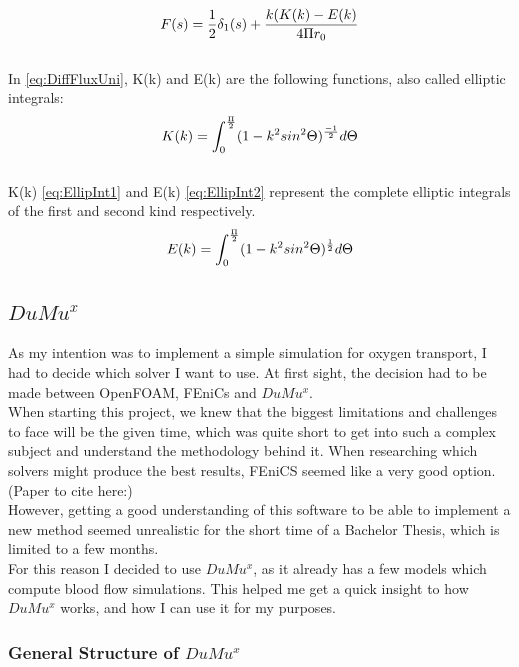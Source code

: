 %
\begin{equation}
\\F(s) = \frac{1}{2} \delta_1 (s) + \frac{k (K(k) - E(k)}{4 \Pi r_0}
\label{eq:DiffFluxUni}
\end{equation}
\\In \ref{eq:DiffFluxUni}, K(k) and E(k) are the following functions, also called elliptic integrals:
%
\begin{equation}
\\K(k) = \int_{0}^{\frac{\Pi}{2}} (1 - k^2 sin^2 \Theta)^ \frac{-1}{2} d \Theta
\label{eq:EllipInt1}
\end{equation}
\\K(k) \ref{eq:EllipInt1} and E(k) \ref{eq:EllipInt2} represent the complete elliptic integrals of the first and second kind respectively.
%
\begin{equation}
\\E(k) = \int_{0}^{\frac{\Pi}{2}} (1 - k^2 sin^2 \Theta)^ \frac{1}{2} d \Theta
\label{eq:EllipInt2}
\end{equation}

\newpage
\subsection{$DuMu^x$}
\label{$DuMu^x$}

As my intention was to implement a simple simulation for oxygen transport, I had to decide which solver I want to use. At first sight, the decision had to be made between OpenFOAM, FEniCs and $DuMu^x$. 
\\When starting this project, we knew that the biggest limitations and challenges to face will be the given time, which was quite short to get into such a complex subject and understand the methodology behind it. When researching which solvers might produce the best results, FEniCS seemed like a very good option.
\\(Paper to cite here:\cite{holter2018sub})
\\However, getting a good understanding of this software to be able to implement a new method seemed unrealistic for the short time of a Bachelor Thesis, which is limited to a few months.
\\For this reason I decided to use $DuMu^x$, as it already has a few models which compute blood flow simulations. This helped me get a quick insight to how $DuMu^x$ works, and how I can use it for my purposes.

\subsubsection{General Structure of $DuMu^x$}

